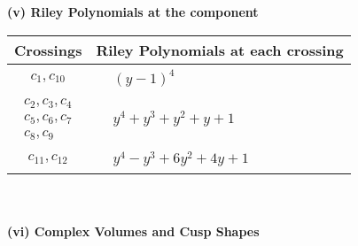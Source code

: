 \documentclass[1p]{elsarticle_modified}
\theoremstyle{definition}
\begin{document}
\newpage\renewcommand{\arraystretch}{1}
\flushleft \textbf{(v) Riley Polynomials at the component}\newline \\
\begin{tabular}{m{50pt}|m{274pt}}
Crossings & \hspace{64pt}Riley Polynomials at each crossing \\
\hline $$\begin{aligned}c_{1},c_{10}\end{aligned}$$&$\begin{aligned}
&(y-1)^4
\end{aligned}$\\
\hline $$\begin{aligned}c_{2},c_{3},c_{4}\\c_{5},c_{6},c_{7}\\c_{8},c_{9}\end{aligned}$$&$\begin{aligned}
&y^4+y^3+y^2+y+1
\end{aligned}$\\
\hline $$\begin{aligned}c_{11},c_{12}\end{aligned}$$&$\begin{aligned}
&y^4- y^3+6 y^2+4 y+1
\end{aligned}$\\
\hline
\end{tabular}\\~\\
\newpage\flushleft \textbf{(vi) Complex Volumes and Cusp Shapes}
\end{document}
